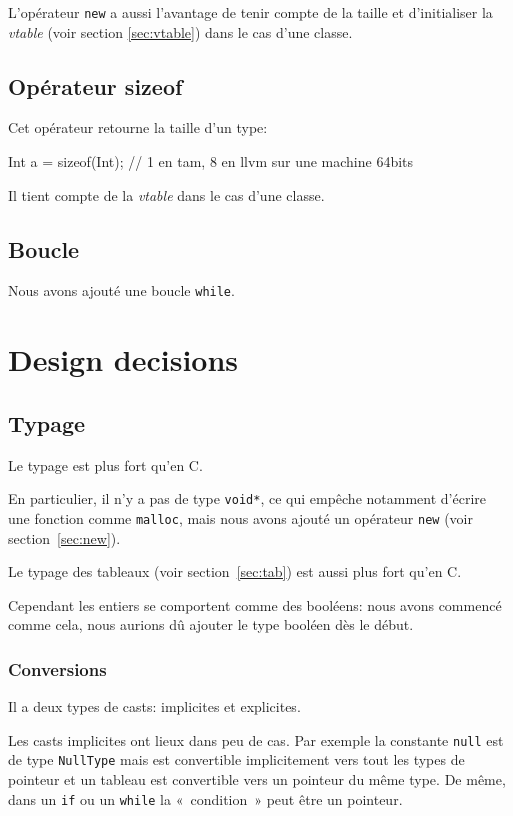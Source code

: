 \documentclass{scrartcl}
\begin{document}
    L'opérateur \verb+new+ a aussi l'avantage de tenir compte de la taille et
    d'initialiser la \textit{vtable} (voir section \ref{sec:vtable}) dans le
    cas d'une classe.

  \subsection{Opérateur sizeof}
    Cet opérateur retourne la taille d'un type:

    \begin{moccode}
Int a = sizeof(Int); // 1 en tam, 8 en llvm sur une machine 64bits
    \end{moccode}

    Il tient compte de la \textit{vtable} dans le cas d'une classe.

  \subsection{Boucle}
    Nous avons ajouté une boucle \verb+while+.

\section{Design decisions}
  \subsection{Typage}
    Le typage est plus fort qu'en C.

    En particulier, il n'y a pas de type \verb+void*+, ce qui empêche notamment
    d'écrire une fonction comme \verb+malloc+, mais nous avons ajouté un
    opérateur \verb+new+ (voir section~\ref{sec:new}).

    Le typage des tableaux (voir section~\ref{sec:tab}) est aussi plus fort qu'en C.

    Cependant les entiers se comportent comme des booléens: nous avons commencé
    comme cela, nous aurions dû ajouter le type booléen dès le début.

    \subsubsection{Conversions}
      Il a deux types de casts: implicites et explicites.

      Les casts implicites ont lieux dans peu de cas. Par exemple la constante
      \verb+null+ est de type \verb+NullType+ mais est convertible
      implicitement vers tout les types de pointeur et un tableau est
      convertible vers un pointeur du même type. De même, dans un \verb+if+ ou
      un \verb+while+ la «~condition~» peut être un pointeur.
\end{document}
